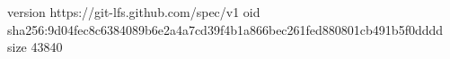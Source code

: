 version https://git-lfs.github.com/spec/v1
oid sha256:9d04fec8c6384089b6e2a4a7cd39f4b1a866bec261fed880801cb491b5f0dddd
size 43840
